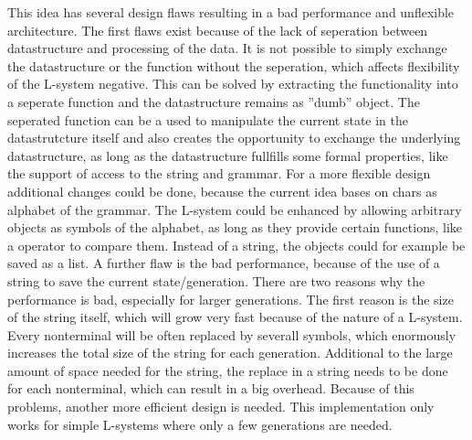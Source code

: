 \documentclass[english]{cpp-hmwk}
\begin{document}
\medskip
\noindent This idea has several design flaws resulting in a bad performance and unflexible architecture. The first flaws exist because of the lack of seperation between datastructure and processing of the data. It is not possible to simply exchange the datastructure or the function without the seperation, which affects flexibility of the L-system negative. This can be solved by extracting the functionality into a seperate function and the datastructure remains as ''dumb'' object. The seperated function can be a used to manipulate the current state in the datastrutcture itself and also creates the opportunity to exchange the underlying datastructure, as long as the datastructure fullfills some formal properties, like the support of access to the string and grammar.\newline
For a more flexible design additional changes could be done, because the current idea bases on chars as alphabet of the grammar. The L-system could be enhanced by allowing arbitrary objects as symbols of the alphabet, as long as they provide certain functions, like a operator to compare them. Instead of a string, the objects could for example be saved as a list.\newline
A further flaw is the bad performance, because of the use of a string to save the current state/generation. There are two reasons why the performance is bad, especially for larger generations. The first reason is the size of the string itself, which will grow very fast because of the nature of a L-system. Every nonterminal will be often replaced by severall symbols, which enormously increases the total size of the string for each generation. Additional to the large amount of space needed for the string, the replace in a string needs to be done for each nonterminal, which can result in a big overhead. Because of this problems, another more efficient design is needed.\newline
This implementation only works for simple L-systems where only a few generations are needed.
\end{document}
